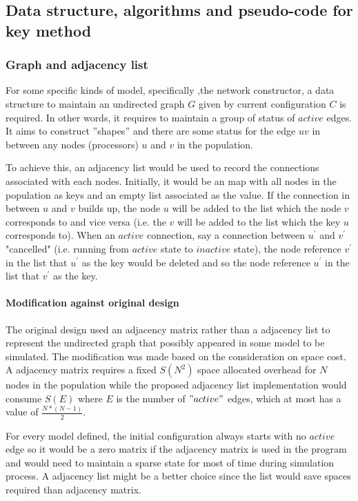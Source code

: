 \subsection{Data structure, algorithms and pseudo-code for key method}
\subsubsection{Graph and adjacency list}
\par\noindent
For some specific kinds of model, specifically ,the network constructor, a data
structure to maintain an undirected graph $G$ given by current configuration $C$ is required. In other words, it requires to maintain
a group of status of $active$ edges. It aims to construct ”shapes”
and there are some status for the edge $uv$ in between any nodes (processors) $u$
and $v$ in the population.

\par\noindent
To achieve this, an adjacency list would be used to record the connections associated
with each nodes. Initially, it would be an map with all nodes in the population
as keys and an empty list associated as the value. If the connection in between $u$ and $v$ builds up,
the node $u$ will be added to the list which the node $v$ corresponds to and vice versa
(i.e. the $v$ will be added to the list which the key $u$ corresponds to). When an $active$
connection, say a connection between $u^{'}$ and $v^{'}$ "cancelled" (i.e.
running from $active$ state to $inactive$ state), the node reference $v^{'}$ in the list that
$u^{'}$ as the key would be deleted and so the node reference $u^{'}$ in the list that
$v^{'}$ as the key.

\paragraph{Modification against original design}
The original design used an adjacency matrix rather than a adjacency list to represent the
undirected graph that possibly appeared in some model to be simulated. The modification was made based on
the consideration on space cost. A adjacency matrix requires a fixed $S(N^{2})$ space allocated overhead
for $N$ nodes in the population while the proposed adjacency list implementation would consume $S(E)$ where
$E$ is the number of $"active"$ edges, which at most has a value of $\frac{N * (N - 1)}{2}$.


\par\noindent
For every model defined, the initial configuration always starts with no $active$ edge so it would be a zero matrix if
the adjacency matrix is used in the program and would need to maintain a sparse state for most of time during simulation process.
A adjacency list might be a better choice since the list would save spaces required than adjacency matrix.

